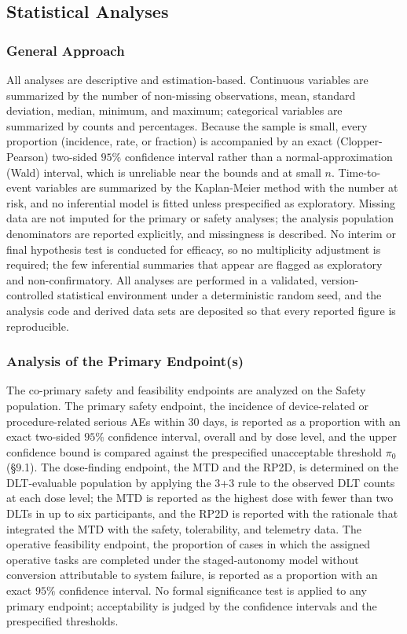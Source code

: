 \subsection{Statistical Analyses}

\subsubsection{General Approach}

All analyses are descriptive and estimation-based. Continuous variables are
summarized by the number of non-missing observations, mean, standard deviation,
median, minimum, and maximum; categorical variables are summarized by counts and
percentages. Because the sample is small, every proportion (incidence, rate, or
fraction) is accompanied by an exact (Clopper-Pearson) two-sided $95\%$ confidence
interval rather than a normal-approximation (Wald) interval, which is unreliable
near the bounds and at small $n$. Time-to-event variables are summarized by the
Kaplan-Meier method with the number at risk, and no inferential model is fitted
unless prespecified as exploratory. Missing data are not imputed for the primary
or safety analyses; the analysis population denominators are reported explicitly,
and missingness is described. No interim or final hypothesis test is conducted for
efficacy, so no multiplicity adjustment is required; the few inferential summaries
that appear are flagged as exploratory and non-confirmatory. All analyses are
performed in a validated, version-controlled statistical environment under a
deterministic random seed, and the analysis code and derived data sets are
deposited so that every reported figure is reproducible.

\subsubsection{Analysis of the Primary Endpoint(s)}

The co-primary safety and feasibility endpoints are analyzed on the Safety
population. The primary safety endpoint, the incidence of device-related or
procedure-related serious AEs within 30 days, is reported as a proportion with an
exact two-sided $95\%$ confidence interval, overall and by dose level, and the
upper confidence bound is compared against the prespecified unacceptable threshold
$\pi_0$ (\S9.1). The dose-finding endpoint, the MTD and the RP2D, is determined on
the DLT-evaluable population by applying the 3+3 rule to the observed DLT counts
at each dose level; the MTD is reported as the highest dose with fewer than two
DLTs in up to six participants, and the RP2D is reported with the rationale that
integrated the MTD with the safety, tolerability, and telemetry data. The
operative feasibility endpoint, the proportion of cases in which the assigned
operative tasks are completed under the staged-autonomy model without conversion
attributable to system failure, is reported as a proportion with an exact $95\%$
confidence interval. No formal significance test is applied to any primary
endpoint; acceptability is judged by the confidence intervals and the prespecified
thresholds.

